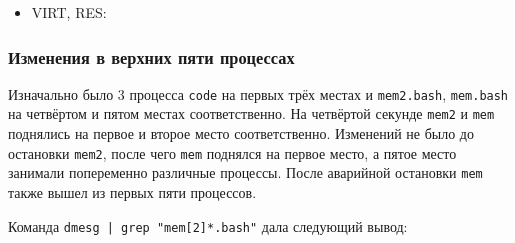 \documentclass[10pt, a4paper]{article}
\begin{document}


\begin{itemize}
    \item VIRT, RES:
\end{itemize}





\subsubsection*{Изменения в верхних пяти процессах}

Изначально было 3 процесса \texttt{code} на первых трёх местах и \texttt{mem2.bash}, \texttt{mem.bash} на четвёртом и пятом местах соответственно. На четвёртой секунде \texttt{mem2} и \texttt{mem} поднялись на первое и второе место соответственно. Изменений не было до остановки \texttt{mem2}, после чего \texttt{mem} поднялся на первое место, а пятое место занимали попеременно различные процессы. После аварийной остановки \texttt{mem} также вышел из первых пяти процессов.

Команда \texttt{dmesg | grep "mem[2]*.bash"} дала следующий вывод:
\end{document}

